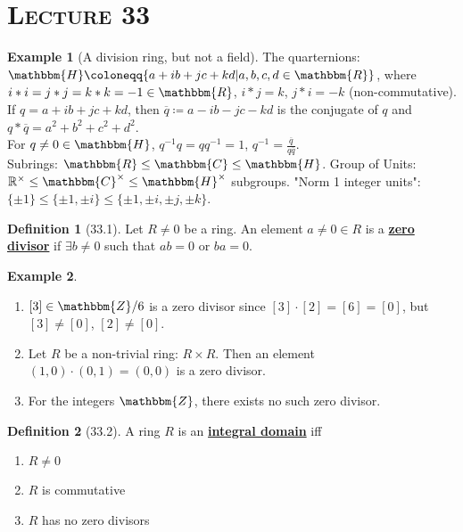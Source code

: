 \documentclass{article}
\newcommand{\Z}{\mathbbm{Z}}
\newcommand{\R}{\mathbbm{R}}
\newcommand{\C}{\mathbbm{C}}
\newcommand{\coleq}{\coloneqq}
\newcommand{\inverse}[1]{#1^{-1}}
\newcommand{\define}[1]{\textbf{\underline{#1}}}
\theoremstyle{definition}
\newtheorem*{defn}{Definition}
\newtheorem*{ex}{Example}
\theoremstyle{remark}
\newcommand{\Rx}{\mathbb{R}^\times}
\renewcommand{\H}{\mathbbm{H}}
\begin{document}
    \section*{\textbf{\textsc{Lecture 33}}}{
        \begin{ex}[A division ring, but not a field]
            The quarternions: $\H\coleq\{a+ib+jc+kd|a,b,c,d\in \R\}$, where $i*i=j*j=k*k=-1 \in \R$, $i*j=k$, $j*i=-k$ (non-commutative). If $q=a+ib+jc+kd$, then $\overline{q}\coleq a-ib-jc-kd$ is the conjugate of $q$ and $q*\overline{q}=a^2+b^2+c^2+d^2$.\\ For $q\neq 0 \in \H$, $\inverse{q}q=q\inverse{q}=1$, $\inverse{q}=\frac{\overline{q}}{q\overline{q}}$.\\
            Subrings: $\R \leq \C \leq \H$. Group of Units: $\Rx\leq \C^\times \leq \H^\times$ subgroups. "Norm 1 integer units": $\{\pm1\} \leq \{\pm1,\pm i\} \leq \{\pm1, \pm i, \pm j, \pm k\}$.
        \end{ex}
        
        \begin{defn}[33.1]
            Let $R\neq 0$ be a ring. An element $a \neq 0 \in R$ is a \define{zero divisor} if $\exists b \neq 0$ such that $ab=0$ or $ba=0$.
        \end{defn}
        
        \begin{ex}
            \begin{enumerate}
                \item $[3]\in \Z/6$ is a zero divisor since $[3]\cdot[2]=[6]=[0]$, but $[3]\neq[0]$, $[2] \neq [0]$.
                \item Let $R$ be a non-trivial ring: $R\times R$. Then an element $(1,0)\cdot(0,1)=(0,0)$ is a zero divisor.
                \item For the integers $\Z$, there exists no such zero divisor.
            \end{enumerate}
        \end{ex}
        
        \begin{defn}[33.2]
            A ring $R$ is an \define{integral domain} iff
            \begin{enumerate}
                \item $R \neq 0$
                \item $R$ is commutative
                \item $R$ has no zero divisors
            \end{enumerate}
        \end{defn}
        
}
\end{document}
